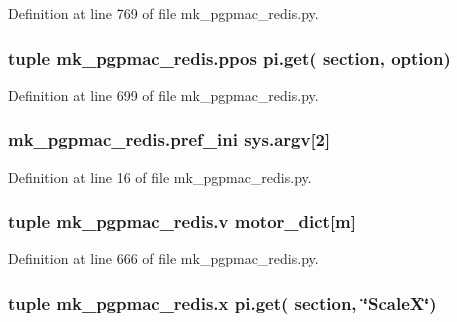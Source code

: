 Definition at line 769 of file mk\-\_\-pgpmac\-\_\-redis.\-py.

\hypertarget{namespacemk__pgpmac__redis_ad9356b4b4c48789f17e6e8fd682e2798}{
\subsubsection[{ppos}]{\setlength{\rightskip}{0pt plus 5cm}tuple mk\-\_\-pgpmac\-\_\-redis.\-ppos pi.\-get( section, option)}}\label{namespacemk__pgpmac__redis_ad9356b4b4c48789f17e6e8fd682e2798}


Definition at line 699 of file mk\-\_\-pgpmac\-\_\-redis.\-py.

\hypertarget{namespacemk__pgpmac__redis_a38c785af5201403976e1267c47ea5096}{
\subsubsection[{pref\-\_\-ini}]{\setlength{\rightskip}{0pt plus 5cm}mk\-\_\-pgpmac\-\_\-redis.\-pref\-\_\-ini sys.\-argv\mbox{[}2\mbox{]}}}\label{namespacemk__pgpmac__redis_a38c785af5201403976e1267c47ea5096}


Definition at line 16 of file mk\-\_\-pgpmac\-\_\-redis.\-py.

\hypertarget{namespacemk__pgpmac__redis_ac732d49b0afca9a9951e3a252bae42fc}{
\subsubsection[{v}]{\setlength{\rightskip}{0pt plus 5cm}tuple mk\-\_\-pgpmac\-\_\-redis.\-v {\bf motor\-\_\-dict}\mbox{[}m\mbox{]}}}\label{namespacemk__pgpmac__redis_ac732d49b0afca9a9951e3a252bae42fc}


Definition at line 666 of file mk\-\_\-pgpmac\-\_\-redis.\-py.

\hypertarget{namespacemk__pgpmac__redis_abc8696f6f2f3fd3edd30989d3c8ec301}{
\subsubsection[{x}]{\setlength{\rightskip}{0pt plus 5cm}tuple mk\-\_\-pgpmac\-\_\-redis.\-x pi.\-get( section, \char`\"{}Scale\-X\char`\"{})}}\label{namespacemk__pgpmac__redis_abc8696f6f2f3fd3edd30989d3c8ec301}


